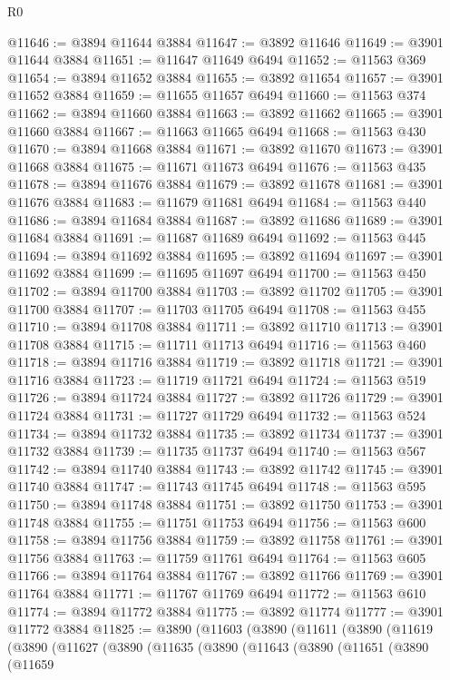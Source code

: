 \begin{lexlean}{R0}
\begin{coremodule}
@11646 := @3894 @11644 @3884
@11647 := @3892 @11646
@11649 := @3901 @11644 @3884
@11651 := @11647 @11649 @6494
@11652 := @11563 @369
@11654 := @3894 @11652 @3884
@11655 := @3892 @11654
@11657 := @3901 @11652 @3884
@11659 := @11655 @11657 @6494
@11660 := @11563 @374
@11662 := @3894 @11660 @3884
@11663 := @3892 @11662
@11665 := @3901 @11660 @3884
@11667 := @11663 @11665 @6494
@11668 := @11563 @430
@11670 := @3894 @11668 @3884
@11671 := @3892 @11670
@11673 := @3901 @11668 @3884
@11675 := @11671 @11673 @6494
@11676 := @11563 @435
@11678 := @3894 @11676 @3884
@11679 := @3892 @11678
@11681 := @3901 @11676 @3884
@11683 := @11679 @11681 @6494
@11684 := @11563 @440
@11686 := @3894 @11684 @3884
@11687 := @3892 @11686
@11689 := @3901 @11684 @3884
@11691 := @11687 @11689 @6494
@11692 := @11563 @445
@11694 := @3894 @11692 @3884
@11695 := @3892 @11694
@11697 := @3901 @11692 @3884
@11699 := @11695 @11697 @6494
@11700 := @11563 @450
@11702 := @3894 @11700 @3884
@11703 := @3892 @11702
@11705 := @3901 @11700 @3884
@11707 := @11703 @11705 @6494
@11708 := @11563 @455
@11710 := @3894 @11708 @3884
@11711 := @3892 @11710
@11713 := @3901 @11708 @3884
@11715 := @11711 @11713 @6494
@11716 := @11563 @460
@11718 := @3894 @11716 @3884
@11719 := @3892 @11718
@11721 := @3901 @11716 @3884
@11723 := @11719 @11721 @6494
@11724 := @11563 @519
@11726 := @3894 @11724 @3884
@11727 := @3892 @11726
@11729 := @3901 @11724 @3884
@11731 := @11727 @11729 @6494
@11732 := @11563 @524
@11734 := @3894 @11732 @3884
@11735 := @3892 @11734
@11737 := @3901 @11732 @3884
@11739 := @11735 @11737 @6494
@11740 := @11563 @567
@11742 := @3894 @11740 @3884
@11743 := @3892 @11742
@11745 := @3901 @11740 @3884
@11747 := @11743 @11745 @6494
@11748 := @11563 @595
@11750 := @3894 @11748 @3884
@11751 := @3892 @11750
@11753 := @3901 @11748 @3884
@11755 := @11751 @11753 @6494
@11756 := @11563 @600
@11758 := @3894 @11756 @3884
@11759 := @3892 @11758
@11761 := @3901 @11756 @3884
@11763 := @11759 @11761 @6494
@11764 := @11563 @605
@11766 := @3894 @11764 @3884
@11767 := @3892 @11766
@11769 := @3901 @11764 @3884
@11771 := @11767 @11769 @6494
@11772 := @11563 @610
@11774 := @3894 @11772 @3884
@11775 := @3892 @11774
@11777 := @3901 @11772 @3884
@11825 := @3890
    (@11603
      (@3890
        (@11611
          (@3890
            (@11619
              (@3890
                (@11627
                  (@3890
                    (@11635
                      (@3890
                        (@11643
                          (@3890
                            (@11651
                              (@3890
                                (@11659

\end{coremodule}
\end{lexlean}
